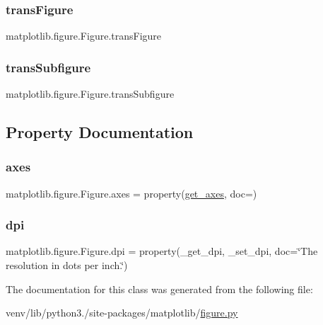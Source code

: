 \subsubsection{\texorpdfstring{trans\+Figure}{transFigure}}
{\footnotesize\ttfamily matplotlib.\+figure.\+Figure.\+trans\+Figure}

\mbox{\label{classmatplotlib_1_1figure_1_1Figure_a73ebbe1922b00927d745d099f599d636}} 
\subsubsection{\texorpdfstring{trans\+Subfigure}{transSubfigure}}
{\footnotesize\ttfamily matplotlib.\+figure.\+Figure.\+trans\+Subfigure}



\subsection{Property Documentation}
\mbox{\label{classmatplotlib_1_1figure_1_1Figure_a222f605f561ab5468751dbbc67e84597}} 
\subsubsection{\texorpdfstring{axes}{axes}}
{\footnotesize\ttfamily matplotlib.\+figure.\+Figure.\+axes = property(\hyperlink{classmatplotlib_1_1figure_1_1Figure_a6367e68d3e0650e547b94b364ea07961}{get\+\_\+axes}, doc=)\hspace{0.3cm}{\ttfamily [static]}}

\mbox{\label{classmatplotlib_1_1figure_1_1Figure_aec13143c0425f2f9b5e40bd6cfda42dc}} 
\subsubsection{\texorpdfstring{dpi}{dpi}}
{\footnotesize\ttfamily matplotlib.\+figure.\+Figure.\+dpi = property(\+\_\+get\+\_\+dpi, \+\_\+set\+\_\+dpi, doc=\char`\"{}The resolution in dots per inch.\char`\"{})\hspace{0.3cm}{\ttfamily [static]}}



The documentation for this class was generated from the following file\+:\begin{DoxyCompactItemize}
\item 
venv/lib/python3./site-\/packages/matplotlib/\hyperlink{figure_8py}{figure.\+py}\end{DoxyCompactItemize}
